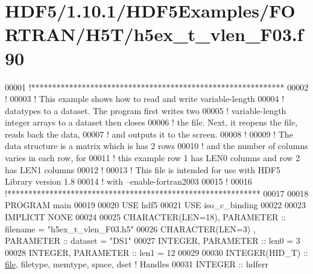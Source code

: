 \hypertarget{_h_d_f5_21_810_81_2_h_d_f5_examples_2_f_o_r_t_r_a_n_2_h5_t_2h5ex__t__vlen___f03_8f90_source}{}\section{H\+D\+F5/1.10.1/\+H\+D\+F5\+Examples/\+F\+O\+R\+T\+R\+A\+N/\+H5\+T/h5ex\+\_\+t\+\_\+vlen\+\_\+\+F03.f90}
\label{_h_d_f5_21_810_81_2_h_d_f5_examples_2_f_o_r_t_r_a_n_2_h5_t_2h5ex__t__vlen___f03_8f90_source}

\begin{DoxyCode}
00001 \textcolor{comment}{!************************************************************}
00002 \textcolor{comment}{!}
00003 \textcolor{comment}{!  This example shows how to read and write variable-length}
00004 \textcolor{comment}{!  datatypes to a dataset.  The program first writes two}
00005 \textcolor{comment}{!  variable-length integer arrays to a dataset then closes}
00006 \textcolor{comment}{!  the file.  Next, it reopens the file, reads back the data,}
00007 \textcolor{comment}{!  and outputs it to the screen.}
00008 \textcolor{comment}{!}
00009 \textcolor{comment}{!  The data structure is a matrix which is has 2 rows}
00010 \textcolor{comment}{!  and the number of columns varies in each row, for }
00011 \textcolor{comment}{!  this example row 1 has LEN0 columns and row 2 has LEN1 columns}
00012 \textcolor{comment}{!}
00013 \textcolor{comment}{!  This file is intended for use with HDF5 Library version 1.8}
00014 \textcolor{comment}{!  with --enable-fortran2003 }
00015 \textcolor{comment}{!}
00016 \textcolor{comment}{!************************************************************}
00017 
00018 \textcolor{keyword}{PROGRAM} main
00019 
00020   \textcolor{keywordtype}{USE }hdf5
00021   \textcolor{keywordtype}{USE }iso\_c\_binding
00022   
00023   \textcolor{keywordtype}{IMPLICIT NONE}
00024 
00025   \textcolor{keywordtype}{CHARACTER(LEN=18)}, \textcolor{keywordtype}{PARAMETER} :: filename  = \textcolor{stringliteral}{"h5ex\_t\_vlen\_F03.h5"}
00026   \textcolor{keywordtype}{CHARACTER(LEN=3)} , \textcolor{keywordtype}{PARAMETER} :: dataset   = \textcolor{stringliteral}{"DS1"}
00027   \textcolor{keywordtype}{INTEGER}, \textcolor{keywordtype}{PARAMETER} :: len0 = 3
00028   \textcolor{keywordtype}{INTEGER}, \textcolor{keywordtype}{PARAMETER} :: len1 = 12
00029 
00030   \textcolor{keywordtype}{INTEGER(HID\_T)}  :: \hyperlink{structfile}{file}, filetype, memtype, space, dset \textcolor{comment}{! Handles}
00031   \textcolor{keywordtype}{INTEGER} :: hdferr

\end{DoxyCode}
